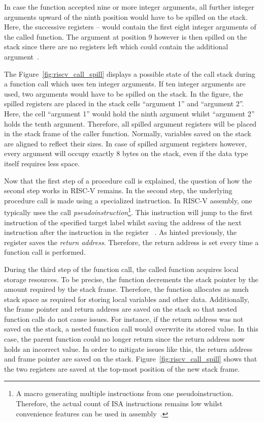 In case the function accepted nine or more integer arguments,
all further integer arguments upward of the ninth position would have to be spilled on the stack.
Here, the successive registers -- would contain the first eight integer arguments of the called function.
The argument at position 9 however is then spilled on the stack since there are no registers left which could contain the additional argument~\cite[p~.8]{RiscvABI2022}.

The Figure~\ref{fig:riscv_call_spill} displays a possible state of the call stack during a function call which uses ten integer arguments.
If ten integer arguments are used, two arguments would have to be spilled on the stack.
In the figure, the spilled registers are placed in the stack cells \enquote{argument 1} and \enquote{argument 2}.
Here, the cell \enquote{argument 1} would hold the ninth argument whilst \enquote{argument 2} holds the tenth argument.
Therefore, all spilled argument registers will be placed in the stack frame of the caller function.
Normally, variables saved on the stack are aligned to reflect their sizes.
In case of spilled argument registers however, every argument will occupy exactly 8 bytes on the stack, even if the data type itself requires less space.

Now that the first step of a procedure call is explained, the question of how the second step works in RISC-V remains.
In the second step, the underlying procedure call is made using a specialized instruction.
In RISC-V assembly, one typically uses the call \emph{pseudoinstruction}\footnote{A macro generating multiple instructions from one pseudoinstruction. Therefore, the actual count of ISA instructions remains low whilst convenience features can be used in assembly~\cite[p.~68]{Dandamudi2005}.}.
This instruction will jump to the first instruction of the specified target label whilst saving the address of the next instruction after the  instruction in the register ~\cite[p.~22]{Patterson2017}.
As hinted previously, the  register saves the \emph{return address}.
Therefore, the return address is set every time a function call is performed.

During the third step of the function call, the called function acquires local storage resources.
To be precise, the function decrements the stack pointer by the amount required by the stack frame.
Therefore, the function allocates as much stack space as required for storing local variables and other data.
Additionally, the frame pointer and return address are saved on the stack so that nested function calls do not cause issues.
For instance, if the return address was not saved on the stack, a nested function call would overwrite its stored value.
In this case, the parent function could no longer return since the return address now holds an incorrect value.
In order to mitigate issues like this, the return address and frame pointer are saved on the stack.
Figure~\ref{fig:riscv_call_spill} shows that the two registers are saved at the top-most position of the new stack frame.

